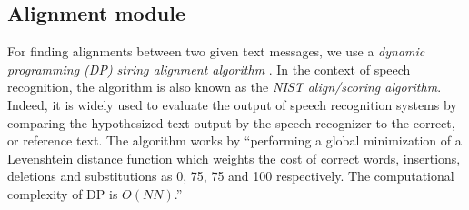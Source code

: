 


\subsection{Alignment module}
\label{secalignmentmodule}



For finding alignments between two given text messages, we use 
a \textit{dynamic programming (DP) string alignment algorithm} \cite{sankoff:1983}. 
In the context of speech recognition, the algorithm is also known as the \textit{NIST align/scoring algorithm}. Indeed, it is widely used to evaluate the output of speech recognition systems by comparing the hypothesized text %
output by the speech recognizer to the correct, or reference %
text. 
%
The %
algorithm works by ``performing a global minimization of a Levenshtein distance function which weights the cost of correct words, insertions, deletions and substitutions as 0, 75, 75 and 100 respectively.
%
The computational complexity of DP is $O(NN)$.''



